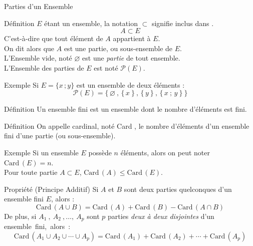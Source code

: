 \documentclass{coursbook}
\begin{document}
    \begin{Gpartie}{Parties d'un Ensemble}
        \begin{Spartie}{Définition}
            $E$ étant un ensemble, la notation $\subset$ signifie \og inclus dans \fg{}.
            \[A\subset E\]
            C'est-à-dire que tout élément de $A$ appartient à $E$. \\
            On dit alors que $A$ est une partie, ou sous-ensemble de $E$. \\
            L'Ensemble vide, noté $\varnothing$ est une \emph{partie} de tout ensemble. \\
            L'Ensemble des parties de $E$ est noté $\mathcal{P}(E)$.
            \begin{SSpartie}{Exemple}
                Si $E=\big\{x\,;y\big\}$ est un ensemble de deux éléments :
                \[\mathcal{P}(E)=\Big\{\,\varnothing~,\,\big\{\,x~\big\}~,\,\big\{\,y~\big\}~,\,\big\{\,x~;\,y~\big\}~\Big\}\]
            \end{SSpartie}
        \end{Spartie}
        \begin{Spartie}{Définition}
            Un ensemble fini est un ensemble dont le nombre d'éléments est fini.
        \end{Spartie}
        \begin{Spartie}{Définition}
            On appelle cardinal, noté \og Card \fg{}, le nombre d'éléments d'un ensemble fini d'une partie (ou sous-ensemble).
            \begin{SSpartie}{Exemple}
                Si un ensemble $E$ possède $n$ éléments, alors on peut noter $\mathrm{Card}\,(E)=n$. \\
                Pour toute partie $A\subset E$, $\mathrm{Card}\,(A)\leq\mathrm{Card}\,(E)$.
            \end{SSpartie}
        \end{Spartie}
        \begin{Spartie}{Propriété (Principe Additif)}
            Si $A$ et $B$ sont deux parties quelconques d'un ensemble fini $E$, alors :
            \[\mathrm{Card}\,(A\cup B)=\mathrm{Card}\,(A)+\mathrm{Card}\,(B)-\mathrm{Card}\,(A\cap B)\]
            De plus, si $A_1~,~A_2~,\dotsc,~A_p$ sont $p$ parties \emph{deux à deux disjointes} d'un ensemble~fini,~alors~:
            \[\mathrm{Card}\,\left(A_1\cup A_2\cup\dotsb\cup A_p\right)=\mathrm{Card}\,(A_1)+\mathrm{Card}\,(A_2)+\dotsb+\mathrm{Card}\,\left(A_p\right)\]
        \end{Spartie}

\end{Gpartie}
\end{document}
